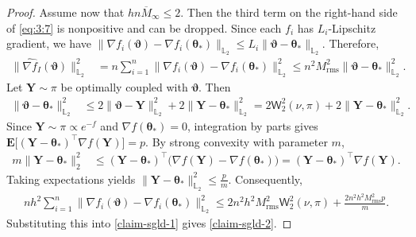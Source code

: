 \documentclass[aos,reqno]{imsart}
\newcommand\bY{\boldsymbol Y}
\newcommand\btheta{\boldsymbol\theta}
\newcommand\bvartheta{\boldsymbol\vartheta}
\def\wass{\mathsf{W}}
\def\Mtwo{M_{\mathrm{rms}}}
\def\Mmaxbar{\overline M_{\infty}}
\theoremstyle{definition}
\begin{document}
\begin{proof}
Assume now that $hn\Mmaxbar\leqslant 2$. Then the third
term on the right-hand side of \eqref{eq:3:7} is
nonpositive and can be dropped. Since each $f_i$ has
$L_i$-Lipschitz gradient, we have $\|\nabla f_i 
(\bvartheta)-\nabla f_i(\btheta_*)\|_{\mathbb L_2}
\leqslant L_i\|\bvartheta-\btheta_*\|_{\mathbb L_2}$. 
Therefore,
\begin{align}
    \|\widehat{\nabla f}_I(\bvartheta)\|_{\mathbb L_2}^2
    &= n\sum_{i=1}^n
    \|\nabla f_i(\bvartheta)
    - \nabla f_i(\btheta_*)\|_{\mathbb L_2}^2 \leqslant
    n^2\Mtwo^2
    \|\bvartheta-\btheta_*\|_{\mathbb L_2}^2.
\end{align}
Let $\bY\sim\pi$ be optimally coupled with $\bvartheta$.
Then
\begin{align}
    \|\bvartheta-\btheta_*\|_{\mathbb L_2}^2
    &\leqslant
    2\|\bvartheta-\bY\|_{\mathbb L_2}^2
    +2\|\bY-\btheta_*\|_{\mathbb L_2}^2 =
    2\wass_2^2(\nu,\pi)
    +2\|\bY-\btheta_*\|_{\mathbb L_2}^2.
\end{align}
Since $\bY\sim\pi\propto e^{-f}$ and
$\nabla f(\btheta_*)=0$, integration by parts gives
$\mathbf E\big[(\bY-\btheta_*)^\top\nabla f(\bY)
\big] = p$. By strong convexity with parameter $m$,
\begin{align}
    m\|\bY-\btheta_*\|_2^2  &\leqslant
    (\bY-\btheta_*)^\top \big(\nabla f(\bY)-\nabla f(\btheta_*)\big) =  (\bY-\btheta_*)^\top 
    \nabla f(\bY).
\end{align}
Taking expectations yields $\|\bY-\btheta_* 
\|_{\mathbb L_2}^2 \leqslant \frac{p}{m}$.
Consequently,
\begin{align}
    nh^2\sum_{i=1}^n
    \|\nabla f_i(\bvartheta)
    -\nabla f_i(\btheta_*)\|_{\mathbb L_2}^2
    \leqslant
    2n^2h^2\Mtwo^2\wass_2^2(\nu,\pi)
    +\frac{2n^2h^2\Mtwo^2p}{m}.
\end{align}
Substituting this into \eqref{claim-sgld-1} gives
\eqref{claim-sgld-2}.


\end{proof}
\end{document}
